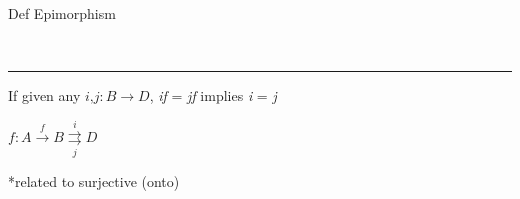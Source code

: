 \begin{note}
  \begin{field}
  Def Epimorphism
  \end{field} \\
  \noindent\rule[0.5ex]{\linewidth}{1pt}
  \begin{field}
  If given any $\textit{i,j}: B \rightarrow D$, \textit{if} = \textit{jf} implies \textit{i} = \textit{j} \\

  \begin{center}
  $f: A \overset{f}{\rightarrow} B \overset{i}{\underset{j}{\rightrightarrows}} D$
  \end{center}

  *related to surjective (onto)
  \end{field}
\end{note}


